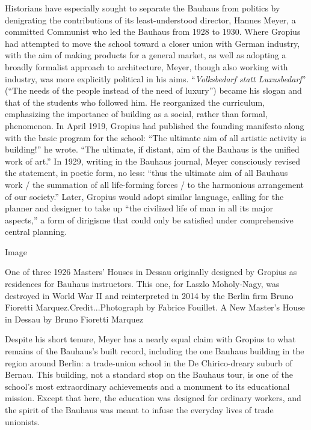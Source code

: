 Historians have especially sought to separate the Bauhaus from politics
by denigrating the contributions of its least-understood director,
Hannes Meyer, a committed Communist who led the Bauhaus from 1928 to
1930. Where Gropius had attempted to move the school toward a closer
union with German industry, with the aim of making products for a
general market, as well as adopting a broadly formalist approach to
architecture, Meyer, though also working with industry, was more
explicitly political in his aims. ``\emph{Volksbedarf statt
Luxusbedarf}'' (``The needs of the people instead of the need of
luxury'') became his slogan and that of the students who followed him.
He reorganized the curriculum, emphasizing the importance of building as
a social, rather than formal, phenomenon. In April 1919, Gropius had
published the founding manifesto along with the basic program for the
school: ``The ultimate aim of all artistic activity is building!'' he
wrote. ``The ultimate, if distant, aim of the Bauhaus is the unified
work of art.'' In 1929, writing in the Bauhaus journal, Meyer
consciously revised the statement, in poetic form, no less: ``thus the
ultimate aim of all Bauhaus work / the summation of all life-forming
forces / to the harmonious arrangement of our society.'' Later, Gropius
would adopt similar language, calling for the planner and designer to
take up ``the civilized life of man in all its major aspects,'' a form
of dirigisme that could only be satisfied under comprehensive central
planning.

Image

One of three 1926 Masters' Houses in Dessau originally designed by
Gropius as residences for Bauhaus instructors. This one, for Laszlo
Moholy-Nagy, was destroyed in World War II and reinterpreted in 2014 by
the Berlin firm Bruno Fioretti Marquez.Credit...Photograph by Fabrice
Fouillet. A New Master's House in Dessau by Bruno Fioretti Marquez

Despite his short tenure, Meyer has a nearly equal claim with Gropius to
what remains of the Bauhaus's built record, including the one Bauhaus
building in the region around Berlin: a trade-union school in the De
Chirico-dreary suburb of Bernau. This building, not a standard stop on
the Bauhaus tour, is one of the school's most extraordinary achievements
and a monument to its educational mission. Except that here, the
education was designed for ordinary workers, and the spirit of the
Bauhaus was meant to infuse the everyday lives of trade unionists.

